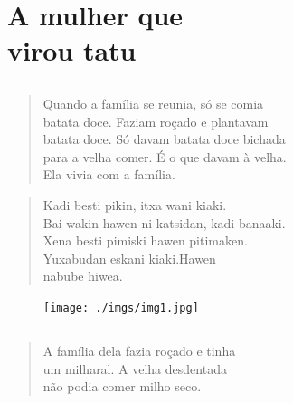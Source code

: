 \openany


\blankpage
\part[A mulher que virou tatu]{A mulher que\\ virou tatu}

\chapter*{}

\mbox{}\vspace*{\fill}

\begin{verse}
Quando a família se reunia, só se comia\\
batata doce. Faziam roçado e plantavam\\
batata doce. Só davam batata doce bichada\\
para a velha comer. É o que davam à velha.\\
Ela vivia com a família.
\end{verse}

\begin{verse}
Kadi besti pikin, itxa wani kiaki.\\
Bai wakin hawen ni katsidan, kadi banaaki.\\
Xena besti pimiski hawen pitimaken.\\
Yuxabudan eskani kiaki.Hawen\\
nabube hiwea.
\end{verse}

\vspace*{\fill}

\pagebreak
\thispagestyle{empty}
\begin{figure}
\vspace*{-1.6cm}
\hspace*{-2.2cm}\texttt{[image: ./imgs/img1.jpg]}
\end{figure}

\chapter*{}

\mbox{}\vspace*{\fill}

\begin{verse}
A família dela fazia roçado e tinha\\
um milharal. A velha desdentada\\
não podia comer milho seco.
\end{verse}

